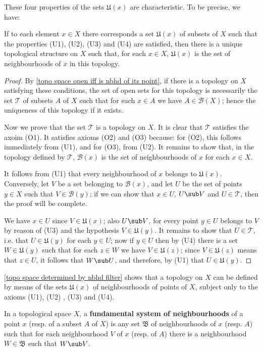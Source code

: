 These four properties of the sets $\mathfrak{U}(x)$ are characteristic. To be precise, we have:
\begin{proposition}\label{topo space determined by nbhd filter}
If to each element $x\in X$ there corresponds a set $\mathfrak{U}(x)$ of subsets of $X$ such that the properties (U1), (U2), (U3) and (U4) are satisfied, then there is a unique topological structure on $X$ such that, for each $x\in X$, $\mathfrak{U}(x)$ is the set of neighbourhoods of $x$ in this topology.
\end{proposition}
\begin{proof}
By \cref{topo space open iff is nbhd of its point}, if there is a topology on $X$ satisfying these conditions, the set of open sets for this topology is necessarily the set $\mathcal{T}$ of subsets $A$ of $X$ such that for each $x\in A$ we have $A\in\mathcal{B}(X)$; hence the uniqueness of this topology if it exists.\par
Now we prove that the set $\mathcal{T}$ is a topology on $X$. It is clear that $\mathcal{T}$ satisfies the axoim (O1). It satisfies axioms (O2) and (O3) because: for (O2), this follows immediately from (U1), and for (O3), from (U2). It remains to show that, in the topology defined by $\mathcal{T}$, $\mathcal{B}(x)$ is the set of neighbourhoods of $x$ for each $x\in X$.\par
It follows from (U1) that every neighbourhood of $x$ belongs to $\mathfrak{U}(x)$. Conversely, let $V$ be a set belonging to $\mathcal{B}(x)$, and let $U$ be the set of points $y\in X$ such that $V\in\mathcal{B}(y)$; if we can show that $x\in U$, $U\sub V$ and $U\in\mathcal{T}$, then the proof will be complete.\par
We have $x\in U$ since $V\in\mathfrak{U}(x)$; also $U\sub V$, for every point $y\in U$ belongs to $V$ by reason of (U3) and the hypothesis $V\in\mathfrak{U}(y)$. It remains to show that $U\in\mathcal{T}$, i.e. that $U\in\mathfrak{U}(y)$ for each $y\in U$; now if $y\in U$ then by (U4) there is a set $W\in\mathfrak{U}(y)$ such that for each $z\in W$ we have $V\in\mathfrak{U}(z)$; since $V\in\mathfrak{U}(z)$ means that $z\in U$, it follows that $W\sub U$, and therefore, by (U1) that $U\in\mathfrak{U}(y)$.
\end{proof}
\cref{topo space determined by nbhd filter} shows that a topology on $X$ can be defined by means of the sets $\mathfrak{U}(x)$ of neighbourhoods of points of $X$, subject only to the axioms (U1), (U2) , (U3) and (U4).
\begin{definition}
In a topological space $X$, a \textbf{fundamental system of neighbourhoods} of a point $x$ (resp. of a subset $A$ of $X$) is any set $\mathfrak{B}$ of neighbourhoods of $x$ (resp. $A$) such that for each neighbourhood $V$ of $x$ (resp. of $A$) there is a neighbourhood $W\in\mathfrak{B}$ such that $W\sub V$.
\end{definition}
